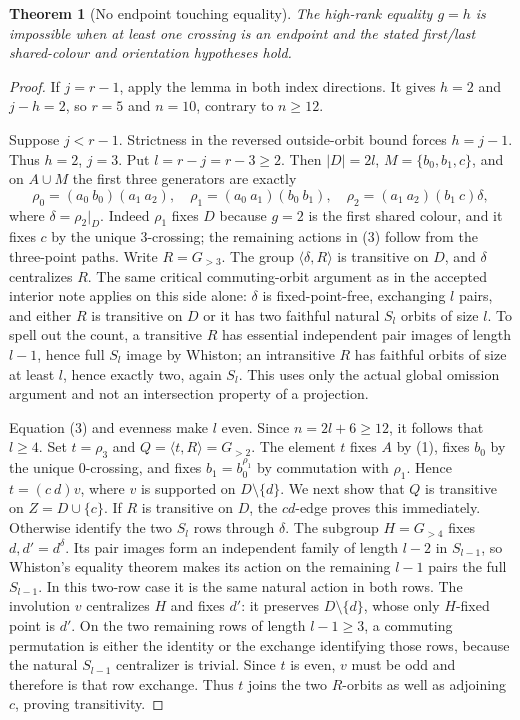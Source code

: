 \documentclass[11pt,a4paper]{article}
\newtheorem{theorem}[lemma]{Theorem}
\newcommand{\gen}[1]{\langle#1\rangle}
\begin{document}
\begin{theorem}[No endpoint touching equality]
The high-rank equality $g=h$ is impossible when at least one
crossing is an endpoint and the stated first/last shared-colour
and orientation hypotheses hold.
\end{theorem}
\begin{proof}
If $j=r-1$, apply the lemma in both index directions. It gives
$h=2$ and $j-h=2$, so $r=5$ and $n=10$, contrary to $n\geq12$.

Suppose $j<r-1$. Strictness in the reversed outside-orbit bound
forces $h=j-1$. Thus $h=2$, $j=3$. Put $l=r-j=r-3\geq2$.
Then $|D|=2l$, $M=\{b_0,b_1,c\}$, and on $A\cup M$ the
first three generators are exactly
\[
 \rho_0=(a_0\ b_0)(a_1\ a_2),\quad
 \rho_1=(a_0\ a_1)(b_0\ b_1),\quad
 \rho_2=(a_1\ a_2)(b_1\ c)\delta,                    \tag{3}
\]
where $\delta=\rho_2|_D$. Indeed $\rho_1$ fixes $D$ because
$g=2$ is the first shared colour, and it fixes $c$ by the
unique $3$-crossing; the remaining actions in (3) follow
from the three-point paths. Write $R=G_{>3}$.
The group $\gen{\delta,R}$ is transitive on $D$, and $\delta$
centralizes $R$. The same critical commuting-orbit argument as
in the accepted interior note applies on this side alone:
$\delta$ is fixed-point-free, exchanging $l$ pairs, and either
$R$ is transitive on $D$ or it has two faithful natural $S_l$
orbits of size $l$. To spell out the count, a transitive $R$
has essential independent pair images of length $l-1$, hence
full $S_l$ image by Whiston; an intransitive $R$ has faithful
orbits of size at least $l$, hence exactly two, again $S_l$.
This uses only the actual global omission argument and not
an intersection property of a projection.

Equation (3) and evenness make $l$ even. Since $n=2l+6\geq12$,
it follows that $l\geq4$. Set $t=\rho_3$ and
$Q=\gen{t,R}=G_{>2}$. The element $t$ fixes $A$ by (1), fixes $b_0$ by the unique
$0$-crossing, and fixes $b_1=b_0^{\rho_1}$ by commutation with
$\rho_1$. Hence $t=(c\ d)v$, where $v$ is supported on
$D\setminus\{d\}$. We next show that $Q$
is transitive on $Z=D\cup\{c\}$.
If $R$ is transitive on $D$, the $cd$-edge proves this immediately.
Otherwise identify the two $S_l$ rows through $\delta$.
The subgroup $H=G_{>4}$ fixes $d,d'=d^\delta$. Its pair
images form an independent family of length $l-2$ in $S_{l-1}$,
so Whiston's equality theorem makes its action on the remaining
$l-1$ pairs the full $S_{l-1}$. In this two-row case it is the
same natural action in both rows. The involution $v$ centralizes
$H$ and fixes $d'$: it preserves $D\setminus\{d\}$, whose only
$H$-fixed point is $d'$. On the two remaining rows of length
$l-1\geq3$, a commuting permutation is either the identity
or the exchange identifying those rows, because the natural
$S_{l-1}$ centralizer is trivial. Since $t$ is even, $v$ must
be odd and therefore is that row exchange. Thus $t$ joins the
two $R$-orbits as well as adjoining $c$, proving transitivity.


\end{proof}
\end{document}
